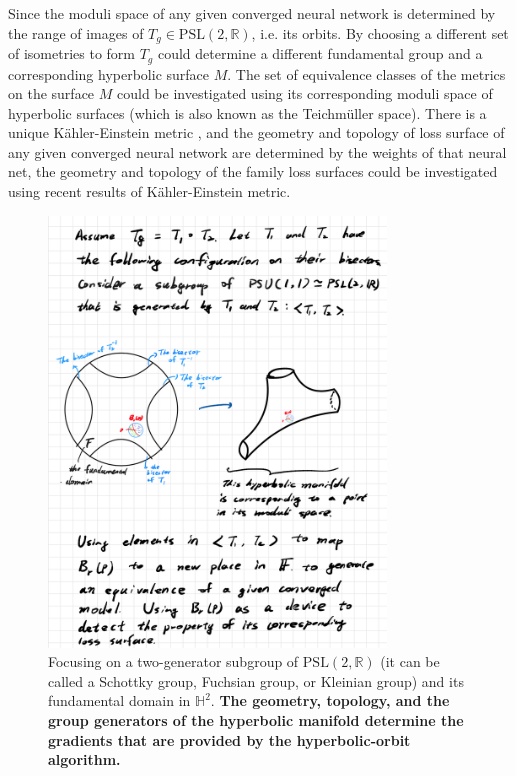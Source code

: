 \documentclass{article}
\theoremstyle{plain}
\theoremstyle{plain} %
\theoremstyle{definition}  %
\theoremstyle{remark}  %
\theoremstyle{plain}
\begin{document}
Since the moduli space of any given converged neural network is determined by the range of images of $T_g\in\text{PSL}(2,\mathbb{R})$, i.e. its orbits. By choosing a different set of isometries to form $T_g$ could determine a different fundamental group and a corresponding hyperbolic surface $M$. The set of equivalence classes of the metrics on the surface $M$ could be investigated using its corresponding moduli space of hyperbolic surfaces (which is also known as the Teichm\"{u}ller space\cite{seppala2011geometry, bers1981finite}). There is a unique K\"{a}hler-Einstein metric \cite{cheng1980existence,hori2003mirror}, and the geometry and topology of loss surface of any given converged neural network are determined by the weights of that neural net, the geometry and topology of the family loss surfaces could be investigated using recent results of K\"{a}hler-Einstein metric.

\begin{figure}[H]
\centering
\includegraphics[width=0.8\textwidth]{11.png}
\caption{Focusing on a two-generator subgroup of $\text{PSL}(2,\mathbb{R})$ (it can be called a Schottky group, Fuchsian group, or Kleinian group) and its fundamental domain in $\mathbb{H}^2$. \textbf{The geometry, topology, and the group generators of the hyperbolic manifold\cite{thurston2022geometry, seppala2011geometry, gromov1981hyperbolic, thurston1982three, mcmullen1992riemann, benedetti20072+} determine the gradients that are provided by the hyperbolic-orbit algorithm.}}
\end{figure}
\end{document}
